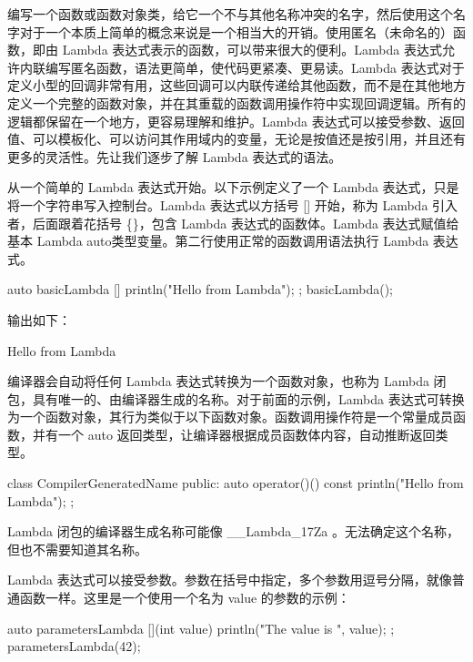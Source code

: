 
编写一个函数或函数对象类，给它一个不与其他名称冲突的名字，然后使用这个名字对于一个本质上简单的概念来说是一个相当大的开销。使用匿名（未命名的）函数，即由 Lambda 表达式表示的函数，可以带来很大的便利。Lambda 表达式允许内联编写匿名函数，语法更简单，使代码更紧凑、更易读。Lambda 表达式对于定义小型的回调非常有用，这些回调可以内联传递给其他函数，而不是在其他地方定义一个完整的函数对象，并在其重载的函数调用操作符中实现回调逻辑。所有的逻辑都保留在一个地方，更容易理解和维护。Lambda 表达式可以接受参数、返回值、可以模板化、可以访问其作用域内的变量，无论是按值还是按引用，并且还有更多的灵活性。先让我们逐步了解 Lambda 表达式的语法。


从一个简单的 Lambda 表达式开始。以下示例定义了一个 Lambda 表达式，只是将一个字符串写入控制台。Lambda 表达式以方括号 [] 开始，称为 Lambda 引入者，后面跟着花括号 \{\}，包含 Lambda 表达式的函数体。Lambda 表达式赋值给基本 Lambda auto类型变量。第二行使用正常的函数调用语法执行 Lambda 表达式。

\begin{cpp}
auto basicLambda { []{ println("Hello from Lambda"); } };
basicLambda();
\end{cpp}

输出如下：

\begin{shell}
Hello from Lambda
\end{shell}

编译器会自动将任何 Lambda 表达式转换为一个函数对象，也称为 Lambda 闭包，具有唯一的、由编译器生成的名称。对于前面的示例，Lambda 表达式可转换为一个函数对象，其行为类似于以下函数对象。函数调用操作符是一个常量成员函数，并有一个 auto 返回类型，让编译器根据成员函数体内容，自动推断返回类型。

\begin{cpp}
class CompilerGeneratedName
{
    public:
        auto operator()() const { println("Hello from Lambda"); }
};
\end{cpp}

Lambda 闭包的编译器生成名称可能像 \_\_Lambda\_17Za 。无法确定这个名称，但也不需要知道其名称。

Lambda 表达式可以接受参数。参数在括号中指定，多个参数用逗号分隔，就像普通函数一样。这里是一个使用一个名为 value 的参数的示例：

\begin{cpp}
auto parametersLambda { [](int value){ println("The value is {}", value); } };
parametersLambda(42);
\end{cpp}

